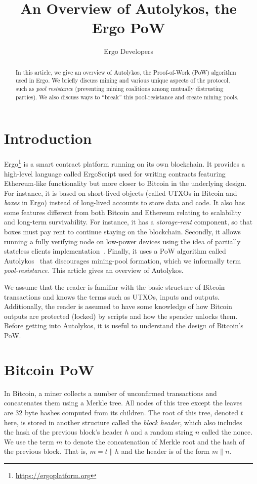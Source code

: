 \documentclass[11pt]{article}
\newcommand{\langname}{ErgoScript\xspace}
\newcommand{\powname}{Autolykos\xspace}
\begin{document}
\title{An Overview of \powname, the Ergo PoW}
\author{Ergo Developers}
\maketitle

\begin{abstract}
	In this article, we give an overview of \powname, the Proof-of-Work (PoW) algorithm used in Ergo. We briefly discuss mining and various unique aspects of the protocol, such as {\em pool resistance} (preventing mining coalitions among mutually distrusting parties). We also discuss ways to ``break'' this pool-resistance and create mining pools. 
	 
\end{abstract}

\section{Introduction}

Ergo\footnote{\url{https://ergoplatform.org}} is a smart contract platform running on its own blockchain. It provides a high-level language called \langname used for writing contracts featuring Ethereum-like functionality but more closer to Bitcoin in the underlying design. For instance, it is based on short-lived objects (called UTXOs in Bitcoin and {\em boxes} in Ergo) instead of long-lived accounts to store data and code. It also has some features different from both Bitcoin and Ethereum relating to scalability and long-term survivability. For instance, it has a {\em storage-rent} component, so that boxes must pay rent to continue staying on the blockchain. Secondly, it allows running a fully verifying node on low-power devices using the idea of partially stateless clients implementation~\cite{RMCI17}. Finally, it uses a PoW algorithm called \powname~\cite{autolykos} that discourages mining-pool formation, which we informally term {\em pool-resistance}. This article gives an overview of \powname. 

We assume that the reader is familiar with the basic structure of Bitcoin transactions and knows the terms such as UTXOs, inputs and outputs. Additionally, the reader is assumed to have some knowledge of how Bitcoin outputs are protected (locked) by scripts and how the spender unlocks them. 
Before getting into \powname, it is useful to understand the design of Bitcoin's PoW. 


\section{Bitcoin PoW}
In Bitcoin, a miner collects a number of unconfirmed transactions and concatenates them using a Merkle tree. All nodes of this tree except the leaves are 32 byte hashes computed from its children. The root of this tree, denoted $t$ here, is stored in another structure called the {\em block header}, which also includes the hash of the previous block's header $h$ and a random string $n$ called the nonce. We use the term $m$ to denote the concatenation of Merkle root and the hash of the previous block. 
That is, $m = t\|h$ and the header is of the form $m\|n$. 
\end{document}
